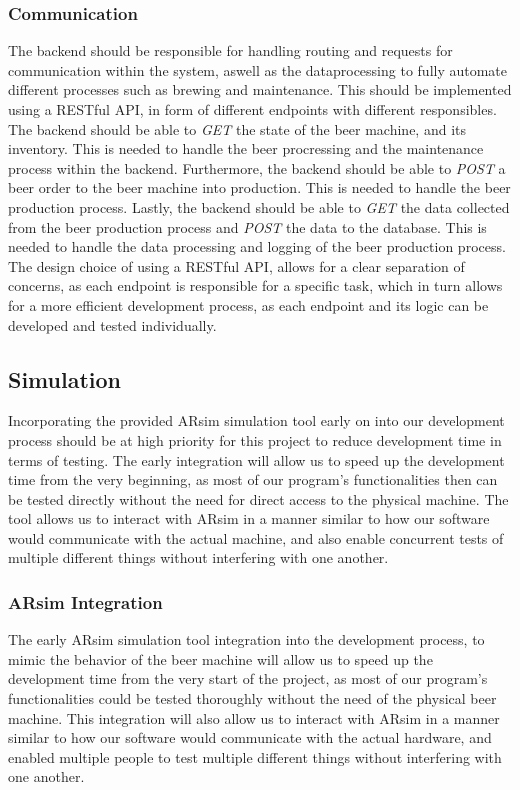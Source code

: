 \subsubsection{Communication}
The backend should be responsible for handling routing and requests for communication within the system, aswell as the dataprocessing to fully automate different processes such as brewing and maintenance. This should be implemented using a RESTful API, in form of different endpoints with different responsibles. \newline 
The backend should be able to \textit{GET} the state of the beer machine, and its inventory. This is needed to handle the beer procressing and the maintenance process within the backend.\newline
Furthermore, the backend should be able to \textit{POST} a beer order to the beer machine into production. This is needed to handle the beer production process.\newline
Lastly, the backend should be able to \textit{GET} the data collected from the beer production process and \textit{POST} the data to the database. This is needed to handle the data processing and logging of the beer production process.
The design choice of using a RESTful API, allows for a clear separation of concerns, as each endpoint is responsible for a specific task, which in turn allows for a more efficient development process, as each endpoint and its logic can be developed and tested individually.

\subsection{Simulation}
Incorporating the provided ARsim simulation tool early on into our development process should be at high priority for this project to reduce development time in terms of testing. 
The early integration will allow us to speed up the development time from the very beginning, as most of our program's functionalities then can be tested directly without the need for direct access to the physical machine.
The tool allows us to interact with ARsim in a manner similar to how our software would communicate with the actual machine, and also enable concurrent tests of multiple different things without interfering with one another.


\subsubsection{ARsim Integration}
The early ARsim simulation tool integration into the development process, to mimic the behavior of the beer machine will allow us to speed up the development time from the very start of the project, as most of our program's functionalities could be tested thoroughly without the need of the physical beer machine.
This integration will also allow us to interact with ARsim in a manner similar to how our software would communicate with the actual hardware, and enabled multiple people to test multiple different things without interfering with one another. 

